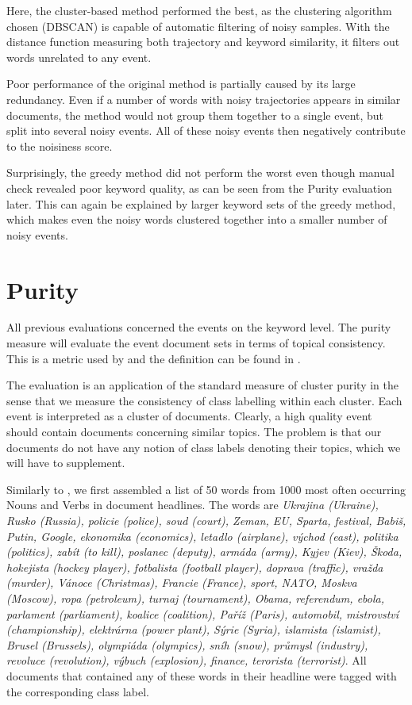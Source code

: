 \hspace{\fill}

Here, the cluster-based method performed the best, as the clustering algorithm chosen (DBSCAN) is capable of automatic filtering of noisy samples. With the distance function measuring both trajectory and keyword similarity, it filters out words unrelated to any event.

Poor performance of the original method is partially caused by its large redundancy. Even if a number of words with noisy trajectories appears in similar documents, the method would not group them together to a single event, but split into several noisy events. All of these noisy events then negatively contribute to the noisiness score.

Surprisingly, the greedy method did not perform the worst even though manual check revealed poor keyword quality, as can be seen from the Purity evaluation later. This can again be explained by larger keyword sets of the greedy method, which makes even the noisy words clustered together into a smaller number of noisy events.

\section{Purity} \label{sec:purity}

All previous evaluations concerned the events on the keyword level. The purity measure will evaluate the event document sets in terms of topical consistency. This is a metric used by \cite{document-purity} and the definition can be found in \cite{information-retrieval}.

The evaluation is an application of the standard measure of cluster purity in the sense that we measure the consistency of class labelling within each cluster. Each event is interpreted as a cluster of documents. Clearly, a high quality event should contain documents concerning similar topics. The problem is that our documents do not have any notion of class labels denoting their topics, which we will have to supplement.

Similarly to \cite{document-purity}, we first assembled a list of 50 words from 1000 most often occurring Nouns and Verbs in document headlines. The words are \textit{Ukrajina (Ukraine), Rusko (Russia), policie (police), soud (court), Zeman, EU, Sparta, festival, Babiš, Putin, Google, ekonomika (economics), letadlo (airplane), východ (east), politika (politics), zabít (to kill), poslanec (deputy), armáda (army), Kyjev (Kiev), Škoda, hokejista (hockey player), fotbalista (football player), doprava (traffic), vražda (murder), Vánoce (Christmas), Francie (France), sport, NATO, Moskva (Moscow), ropa (petroleum), turnaj (tournament), Obama, referendum, ebola, parlament (parliament), koalice (coalition), Paříž (Paris), automobil, mistrovství (championship), elektrárna (power plant), Sýrie (Syria), islamista (islamist), Brusel (Brussels), olympiáda (olympics), sníh (snow), průmysl (industry), revoluce (revolution), výbuch (explosion), finance, terorista (terrorist)}. All documents that contained any of these words in their headline were tagged with the corresponding class label.

